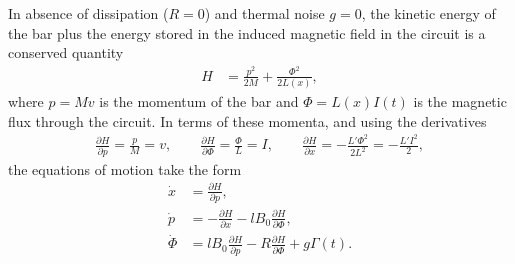 \documentclass[11pt]{article}
\begin{document}
In absence of dissipation ($R=0$) and thermal noise $g=0$, the kinetic energy of the bar plus the energy stored in the induced magnetic field in the circuit is a conserved quantity
\begin{align}
  H&=\frac{p^2}{2M}+\frac{\Phi^2}{2L(x)},
\end{align}
where $p=Mv$ is the momentum of the bar and $\Phi=L(x)I(t)$ is the magnetic flux through the circuit. In terms of these momenta, and using the derivatives
\begin{align}
  \frac{\partial H}{\partial p}=\frac{p}{M}=v,\qquad\frac{\partial H}{\partial\Phi}=\frac{\Phi}{L}=I,\qquad\frac{\partial H}{\partial x}=-\frac{L'\Phi^2}{2L^2}=-\frac{L'I^2}{2},
\end{align}
the equations of motion take the form
\begin{align}
  \dot{x}&=\frac{\partial H}{\partial p},\nonumber\\
  \dot{p}&=-\frac{\partial H}{\partial x}-lB_0\frac{\partial H}{\partial\Phi},\nonumber\\
  \dot{\Phi}&=lB_0\frac{\partial H}{\partial p}-R\frac{\partial H}{\partial\Phi}+g\Gamma(t).
  \label{eom}
\end{align}
\end{document}
